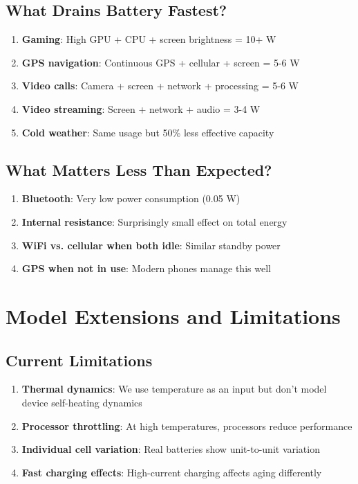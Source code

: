 \documentclass[12pt]{article}
\begin{document}
\subsection{What Drains Battery Fastest?}

\begin{enumerate}
    \item \textbf{Gaming}: High GPU + CPU + screen brightness = 10+ W
    \item \textbf{GPS navigation}: Continuous GPS + cellular + screen = 5-6 W
    \item \textbf{Video calls}: Camera + screen + network + processing = 5-6 W
    \item \textbf{Video streaming}: Screen + network + audio = 3-4 W
    \item \textbf{Cold weather}: Same usage but 50\% less effective capacity
\end{enumerate}

\subsection{What Matters Less Than Expected?}

\begin{enumerate}
    \item \textbf{Bluetooth}: Very low power consumption (0.05 W)
    \item \textbf{Internal resistance}: Surprisingly small effect on total energy
    \item \textbf{WiFi vs. cellular when both idle}: Similar standby power
    \item \textbf{GPS when not in use}: Modern phones manage this well
\end{enumerate}

\section{Model Extensions and Limitations}

\subsection{Current Limitations}

\begin{enumerate}
    \item \textbf{Thermal dynamics}: We use temperature as an input but don't model device self-heating dynamics
    \item \textbf{Processor throttling}: At high temperatures, processors reduce performance
    \item \textbf{Individual cell variation}: Real batteries show unit-to-unit variation
    \item \textbf{Fast charging effects}: High-current charging affects aging differently
\end{enumerate}
\end{document}

